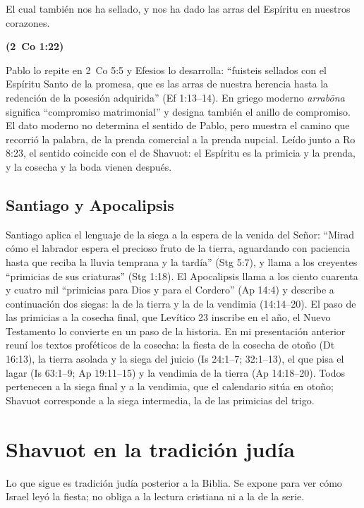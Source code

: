 \documentclass[11pt,letterpaper]{article}
\newcommand{\fuente}[1]{\par\hfill{\upshape\bfseries\small\textcolor{tierraroja}{#1}}}
\begin{document}
\begin{cita}El cual también nos ha sellado, y nos ha dado las arras del Espíritu en nuestros corazones.\fuente{(2~Co 1:22)}\end{cita}

Pablo lo repite en 2~Co 5:5 y Efesios lo desarrolla: ``fuisteis sellados con el Espíritu Santo de la promesa, que es las arras de nuestra herencia hasta la redención de la posesión adquirida'' (Ef 1:13--14). En griego moderno \emph{arrabōna} significa ``compromiso matrimonial'' y designa también el anillo de compromiso. El dato moderno no determina el sentido de Pablo, pero muestra el camino que recorrió la palabra, de la prenda comercial a la prenda nupcial. Leído junto a Ro 8:23, el sentido coincide con el de Shavuot: el Espíritu es la primicia y la prenda, y la cosecha y la boda vienen después.

\subsection{Santiago y Apocalipsis}

Santiago aplica el lenguaje de la siega a la espera de la venida del Señor: ``Mirad cómo el labrador espera el precioso fruto de la tierra, aguardando con paciencia hasta que reciba la lluvia temprana y la tardía'' (Stg 5:7), y llama a los creyentes ``primicias de sus criaturas'' (Stg 1:18). El Apocalipsis llama a los ciento cuarenta y cuatro mil ``primicias para Dios y para el Cordero'' (Ap 14:4) y describe a continuación dos siegas: la de la tierra y la de la vendimia (14:14--20). El paso de las primicias a la cosecha final, que Levítico 23 inscribe en el año, el Nuevo Testamento lo convierte en un paso de la historia. En mi presentación anterior reuní los textos proféticos de la cosecha: la fiesta de la cosecha de otoño (Dt 16:13), la tierra asolada y la siega del juicio (Is 24:1--7; 32:1--13), el que pisa el lagar (Is 63:1--9; Ap 19:11--15) y la vendimia de la tierra (Ap 14:18--20). Todos pertenecen a la siega final y a la vendimia, que el calendario sitúa en otoño; Shavuot corresponde a la siega intermedia, la de las primicias del trigo.

\section{Shavuot en la tradición judía}

Lo que sigue es tradición judía posterior a la Biblia. Se expone para ver cómo Israel leyó la fiesta; no obliga a la lectura cristiana ni a la de la serie.
\end{document}
